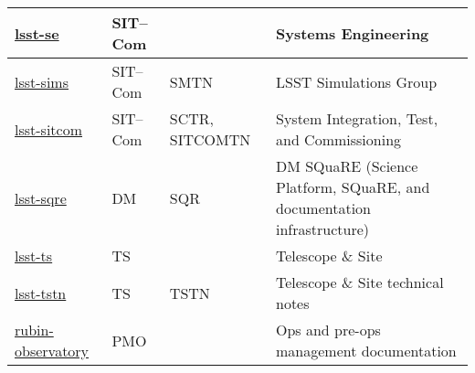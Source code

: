 \begin{small}
\begin{longtable}{p{}p{}p{}p{}}
\href{https://github.com/lsst-se}{lsst-se}				& SIT--Com	& &	Systems Engineering \\\hline
\href{https://github.com/lsst-sims}{lsst-sims}				& SIT--Com	& SMTN	& LSST Simulations Group \\\hline
\href{https://github.com/lsst-sitcom}{lsst-sitcom}			& SIT--Com	& SCTR, SITCOMTN	& System Integration, Test, and Commissioning \\\hline
\href{https://github.com/lsst-sqre}{lsst-sqre}				& DM		& SQR	& DM SQuaRE (Science Platform, SQuaRE, and documentation infrastructure) \\\hline
\href{https://github.com/lsst-ts}{lsst-ts}				& TS			& &	Telescope \& Site \\\hline
\href{https://github.com/lsst-tstn}{lsst-tstn}				& TS			& TSTN	& Telescope \& Site  technical notes \\\hline
\href{https://github.com/rubin-observatory}{rubin-observatory}		& PMO		& &	Ops and pre-ops management documentation \\\hline

\end{longtable}

\end{small}
